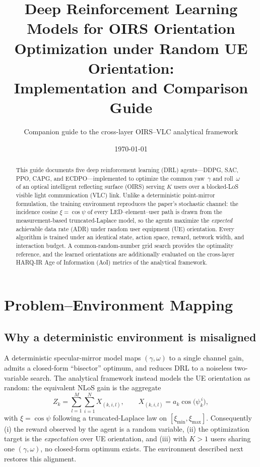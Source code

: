 \documentclass[11pt,a4paper]{article}
\title{Deep Reinforcement Learning Models for OIRS Orientation Optimization
under Random UE Orientation:\\ Implementation and Comparison Guide}
\author{Companion guide to the cross-layer OIRS--VLC analytical framework}
\date{\today}
\begin{document}
\maketitle

\begin{abstract}
This guide documents five deep reinforcement learning (DRL) agents---DDPG, SAC,
PPO, CAPG, and ECDPO---implemented to optimize the common yaw~$\gamma$ and
roll~$\omega$ of an optical intelligent reflecting surface (OIRS) serving $K$
users over a blocked-LoS visible light communication (VLC) link. Unlike a
deterministic point-mirror formulation, the training environment reproduces the
paper's stochastic channel: the incidence cosine $\xi=\cos\psi$ of every
LED--element--user path is drawn from the measurement-based truncated-Laplace
model, so the agents maximize the \emph{expected} achievable data rate (ADR)
under random user equipment (UE) orientation. Every algorithm is trained under
an identical state, action space, reward, network width, and interaction
budget. A common-random-number grid search provides the optimality reference,
and the learned orientations are additionally evaluated on the cross-layer
HARQ-IR Age of Information (AoI) metrics of the analytical framework.
\end{abstract}

\section{Problem--Environment Mapping}

\subsection{Why a deterministic environment is misaligned}
A deterministic specular-mirror model maps $(\gamma,\omega)$ to a single
channel gain, admits a closed-form ``bisector'' optimum, and reduces DRL to a
noiseless two-variable search. The analytical framework instead models the UE
orientation as random: the equivalent NLoS gain is the aggregate
\begin{equation}
Z_k=\sum_{l=1}^{M}\sum_{i=1}^{N}X_{(k,i,l)},\qquad
X_{(k,i,l)}=a_k\cos\bigl(\psi_k^{\,i}\bigr),
\label{eq:Zk}
\end{equation}
with $\xi=\cos\psi$ following a truncated-Laplace law on
$[\xi_{\min},\xi_{\max}]$. Consequently (i) the reward observed by the agent is
a random variable, (ii) the optimization target is the \emph{expectation} over
UE orientation, and (iii) with $K>1$ users sharing one $(\gamma,\omega)$, no
closed-form optimum exists. The environment described next restores this
alignment.
\end{document}

